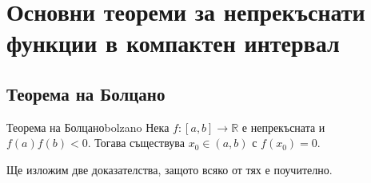 \section{Основни теореми за непрекъснати функции в компактен интервал}

\subsection{Теорема на Болцано}

\begin{theorem}{Теорема на Болцано}{bolzano}
Нека $f : [a, b] \to \mathbb{R}$ е непрекъсната и $f(a)f(b) < 0$. Тогава съществува $x_0 \in (a, b)$ с $f(x_0) = 0$.
\end{theorem}

Ще изложим две доказателства, защото всяко от тях е поучително.

